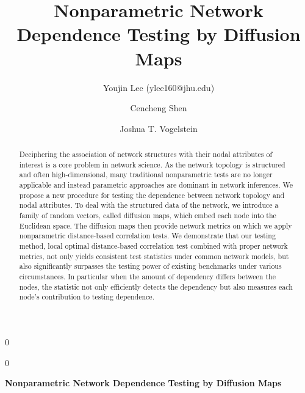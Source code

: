 \documentclass[11pt]{article}
\theoremstyle{definition}
\newcommand{\blind}{0}
\begin{document}
\def\spacingset#1{\renewcommand{\baselinestretch}%
{#1}\small\normalsize} \spacingset{1}

\title{\bf Nonparametric Network Dependence Testing by Diffusion Maps}
\blind
{\author[1]{Youjin Lee (ylee160@jhu.edu)} %
	\author[2]{Cencheng Shen} %
	\author[2,3,4]{Joshua T. Vogelstein}
  \date{}
	\maketitle
} \fi

	\blind
	{
		\bigskip
		\bigskip
		\bigskip
		\begin{center}
			{\LARGE\bf Nonparametric Network Dependence Testing by Diffusion Maps}
		\end{center}
		\medskip
	} \fi

\begin{abstract}
Deciphering the association of network structures with their nodal attributes of interest is a core problem in network science. As the network topology is structured and often high-dimensional, many traditional nonparametric tests are no longer applicable and instead parametric approaches are dominant in network inferences. We propose a new procedure for testing the dependence between network topology and nodal attributes. To deal with the structured data of the network, we introduce a family of random vectors, called diffusion maps, which embed each node into the Euclidean space. The diffusion maps then provide network metrics on which we apply nonparametric distance-based correlation tests. We demonstrate that our testing method, local optimal distance-based correlation test combined with proper network metrics, not only yields consistent test statistics under common network models, but also significantly surpasses the testing power of existing benchmarks under various circumstances. In particular when the amount of dependency differs between the nodes, the statistic not only efficiently detects the dependency but also measures each node's contribution to testing dependence. 
\end{abstract}
\end{document}
